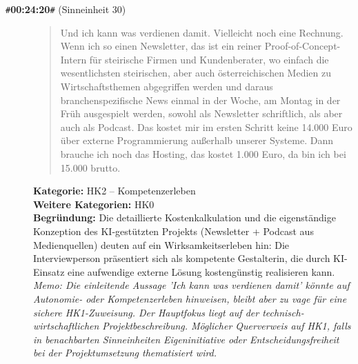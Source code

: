 \begin{description}
  \item[\texttt{\#}\textbf{00:24:20}\texttt{\#} (Sinneinheit 30)]
  \begin{quote}
  Und ich kann was verdienen damit. Vielleicht noch eine Rechnung. Wenn ich so einen Newsletter, das ist ein reiner Proof-of-Concept-Intern für steirische Firmen und Kundenberater, wo einfach die wesentlichsten steirischen, aber auch österreichischen Medien zu Wirtschaftsthemen abgegriffen werden und daraus branchenspezifische News einmal in der Woche, am Montag in der Früh ausgespielt werden, sowohl als Newsletter schriftlich, als aber auch als Podcast. Das kostet mir im ersten Schritt keine 14.000 Euro über externe Programmierung außerhalb unserer Systeme. Dann brauche ich noch das Hosting, das kostet 1.000 Euro, da bin ich bei 15.000 brutto.
  \end{quote}
  \textbf{Kategorie:} HK2 -- Kompetenzerleben\\
  \textbf{Weitere Kategorien:} HK0\\
  \textbf{Begr\"undung:} Die detaillierte Kostenkalkulation und die eigenständige Konzeption des KI-gestützten Projekts (Newsletter + Podcast aus Medienquellen) deuten auf ein Wirksamkeitserleben hin: Die Interviewperson präsentiert sich als kompetente Gestalterin, die durch KI-Einsatz eine aufwendige externe Lösung kostengünstig realisieren kann.
  \\\textit{Memo: Die einleitende Aussage 'Ich kann was verdienen damit' könnte auf Autonomie- oder Kompetenzerleben hinweisen, bleibt aber zu vage für eine sichere HK1-Zuweisung. Der Hauptfokus liegt auf der technisch-wirtschaftlichen Projektbeschreibung. Möglicher Querverweis auf HK1, falls in benachbarten Sinneinheiten Eigeninitiative oder Entscheidungsfreiheit bei der Projektumsetzung thematisiert wird.}
\end{description}
\medskip


